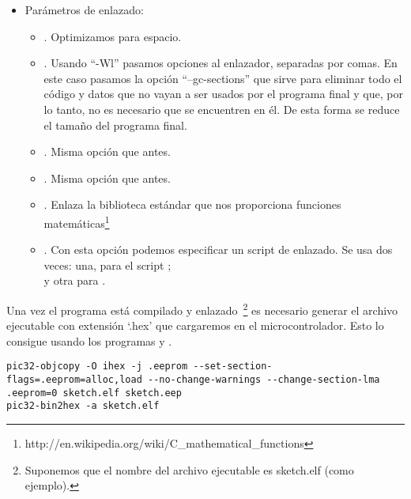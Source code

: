 \begin{itemize}
\begin{itemize}
        \item {}. Definimos el macro ``ARDUINO'' con valor 1.
        \item {}.Definimos el macro ``\_BOARD\_MEGA\_'' con valor 1. Indica que estamos usando una placa con el formato de un Arduino Mega.
        \item {}. Definimos el valor de ``MPIDEVER'', que es ``0x01000305''.
        \item {}. Definimos la versión de  que hemos usado. En nuestro caso es la versión 23.
    \end{itemize}
    \item Parámetros de enlazado:
        \begin{itemize}
            \item {}. Optimizamos para espacio.
            \item {}. Usando ``-Wl'' pasamos opciones al enlazador, separadas por comas. En este caso pasamos la opción ``--gc-sections'' que sirve para eliminar todo el código y datos que no vayan a ser usados por el programa final y que, por lo tanto, no es necesario que se encuentren en él. De esta forma se reduce el tamaño del programa final.
            \item {}. Misma opción que antes.
            \item {}. Misma opción que antes.
            \item {}. Enlaza la biblioteca estándar  que nos proporciona funciones matemáticas\protect\footnote{http://en.wikipedia.org/wiki/C\_mathematical\_functions}
            \item {}. Con esta opción podemos especificar un script de enlazado. Se usa dos veces: una, para el script ;\\  y otra para .
        \end{itemize}
\end{itemize}

Una vez el programa está compilado y enlazado~\protect\footnote{Suponemos que el nombre del archivo ejecutable es sketch.elf (como ejemplo).} es necesario generar el archivo ejecutable con extensión `.hex' que cargaremos en el microcontrolador. Esto lo consigue  usando los programas  y .
\begin{lstlisting}[breaklines=true]
pic32-objcopy -O ihex -j .eeprom --set-section-flags=.eeprom=alloc,load --no-change-warnings --change-section-lma .eeprom=0 sketch.elf sketch.eep
pic32-bin2hex -a sketch.elf
\end{lstlisting}

